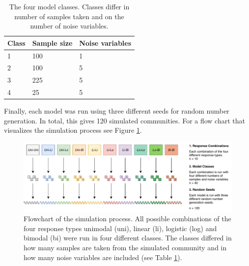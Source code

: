 		\begin{table}[h!]
			\begin{center}
				
				\caption{The four model classes. Classes differ in number of samples taken and on the number of noise variables.}
				\begin{tabular}{@{}lll@{}}
					\toprule
					 Class & Sample size & Noise variables  \\
					\hline
					1 & 100 & 1 \\
					2 & 100 & 5 \\
					3 & 225 & 5 \\
					4 & 25  & 5 \\	
					\bottomrule
				\end{tabular}
				
				\label{table:classes}
			\end{center}
		\end{table}
	
	
		Finally, each model was run using three different seeds for random number generation. 
		In total, this gives 120 simulated communities. 
		For a flow chart that visualizes the simulation process see Figure \ref{fig:flowchart_simulation}.\\
		
		\begin{figure}[h!]
			\centering
			\includegraphics[width=1\linewidth]{../02_Figures/Flowchart}
			\caption{Flowchart of the simulation process. All possible combinations of the four response types unimodal (uni), linear (li), logistic (log) and bimodal (bi) were run in four different classes. The classes differed in how many samples are taken from the simulated community and in how many noise variables are included (see Table \ref{table:classes}).}
			\label{fig:flowchart_simulation}
		\end{figure}
	


